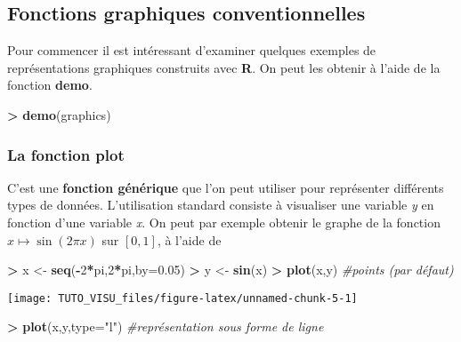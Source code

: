 \documentclass[]{article}
\newenvironment{Shaded}{\begin{snugshade}}{\end{snugshade}}
\newcommand{\CommentTok}[1]{\textcolor[rgb]{0.56,0.35,0.01}{\textit{#1}}}
\newcommand{\DataTypeTok}[1]{\textcolor[rgb]{0.13,0.29,0.53}{#1}}
\newcommand{\DecValTok}[1]{\textcolor[rgb]{0.00,0.00,0.81}{#1}}
\newcommand{\FloatTok}[1]{\textcolor[rgb]{0.00,0.00,0.81}{#1}}
\newcommand{\KeywordTok}[1]{\textcolor[rgb]{0.13,0.29,0.53}{\textbf{#1}}}
\newcommand{\NormalTok}[1]{#1}
\newcommand{\OperatorTok}[1]{\textcolor[rgb]{0.81,0.36,0.00}{\textbf{#1}}}
\newcommand{\StringTok}[1]{\textcolor[rgb]{0.31,0.60,0.02}{#1}}
\theoremstyle{definition}
\theoremstyle{definition}
\theoremstyle{definition}
\theoremstyle{remark}
\begin{document}
\hypertarget{fonctions-graphiques-conventionnelles}{%
\subsection{Fonctions graphiques conventionnelles}\label{fonctions-graphiques-conventionnelles}}

Pour commencer il est intéressant d'examiner quelques exemples de représentations graphiques construits avec \textbf{R}. On peut les obtenir à l'aide de la fonction \textbf{demo}.

\begin{Shaded}
\begin{Highlighting}[]
\OperatorTok{>}\StringTok{ }\KeywordTok{demo}\NormalTok{(graphics)}
\end{Highlighting}
\end{Shaded}

\hypertarget{la-fonction-plot}{%
\subsubsection{\texorpdfstring{La fonction \textbf{plot}}{La fonction plot}}\label{la-fonction-plot}}

C'est une \textbf{fonction générique} que l'on peut utiliser pour représenter différents types de données. L'utilisation standard consiste à visualiser une variable \emph{y} en fonction d'une variable \emph{x}. On peut par exemple obtenir le graphe de la fonction \(x\mapsto \sin(2\pi x)\) sur \([0,1]\), à l'aide de

\begin{Shaded}
\begin{Highlighting}[]
\OperatorTok{>}\StringTok{ }\NormalTok{x <-}\StringTok{ }\KeywordTok{seq}\NormalTok{(}\OperatorTok{-}\DecValTok{2}\OperatorTok{*}\NormalTok{pi,}\DecValTok{2}\OperatorTok{*}\NormalTok{pi,}\DataTypeTok{by=}\FloatTok{0.05}\NormalTok{)}
\OperatorTok{>}\StringTok{ }\NormalTok{y <-}\StringTok{ }\KeywordTok{sin}\NormalTok{(x)}
\OperatorTok{>}\StringTok{ }\KeywordTok{plot}\NormalTok{(x,y) }\CommentTok{#points (par défaut)}
\end{Highlighting}
\end{Shaded}

\begin{center}\texttt{[image: TUTO\_VISU\_files/figure-latex/unnamed-chunk-5-1]} \end{center}

\begin{Shaded}
\begin{Highlighting}[]
\OperatorTok{>}\StringTok{ }\KeywordTok{plot}\NormalTok{(x,y,}\DataTypeTok{type=}\StringTok{"l"}\NormalTok{) }\CommentTok{#représentation sous forme de ligne}
\end{Highlighting}
\end{Shaded}
\end{document}
